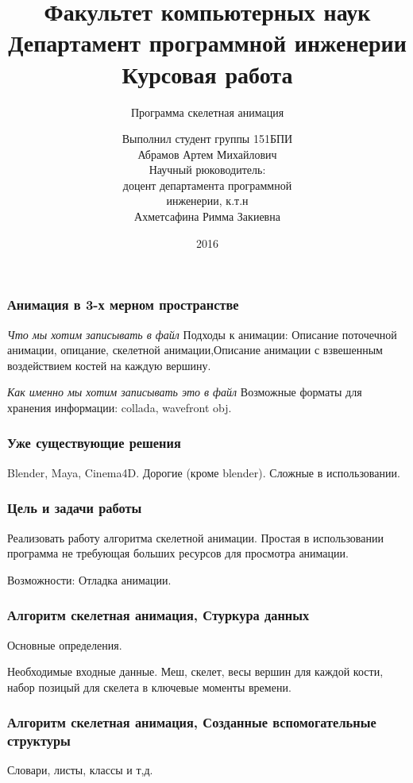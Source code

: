 \documentclass{beamer}
\title[Курсовая работа]{\scriptsize{%
Факультет компьютерных наук \\%
Департамент программной инженерии \\%
Курсовая работа \\%
}}
\subtitle{Программа скелетная анимация}
\author[Абрамов Артем 151 БПИ]{\scriptsize{%
Выполнил студент группы 151БПИ \\%
Абрамов Артем Михайлович \\%
Научный рюководитель: \\%
доцент департамента программной \\%
инженерии, к.т.н \\%
Ахметсафина Римма Закиевна}}
\date{2016}
\begin{document}

\frame[plain]{\titlepage}	%


\begin{frame}
\frametitle{Анимация в 3-х мерном пространстве}
	\emph{Что мы хотим записывать в файл} 
	Подходы к анимации: Описание поточечной анимации, опицание, скелетной анимации,Описание анимации с взвешенным воздействием костей на каждую вершину.

\emph{Как именно мы хотим записывать это в файл}
    Возможные форматы для хранения информации: collada, wavefront obj.	
\end{frame}


\begin{frame}
\frametitle{Уже существующие решения}
    Blender, Maya, Cinema4D.
    Дорогие (кроме blender). Сложные в использовании.
    
\end{frame}



\begin{frame}
\frametitle{Цель и задачи работы}
    Реализовать работу алгоритма скелетной анимации.
    \medskip	
	Простая в использовании программа не требующая больших ресурсов для просмотра анимации.
	
	\medskip
    Возможности: Отладка анимации.
\end{frame}


\begin{frame}
\frametitle{Алгоритм скелетная анимация, Стуркура данных}
	Основные определения.
	
	\medskip
	
	Необходимые входные данные. Меш, скелет, весы вершин для каждой кости, набор позицый для скелета в ключевые моменты времени.

\end{frame}


\begin{frame}
\frametitle{Алгоритм скелетная анимация, Созданные вспомогательные структуры}
	Словари, листы, классы и т,д.
\end{frame}
\end{document}
